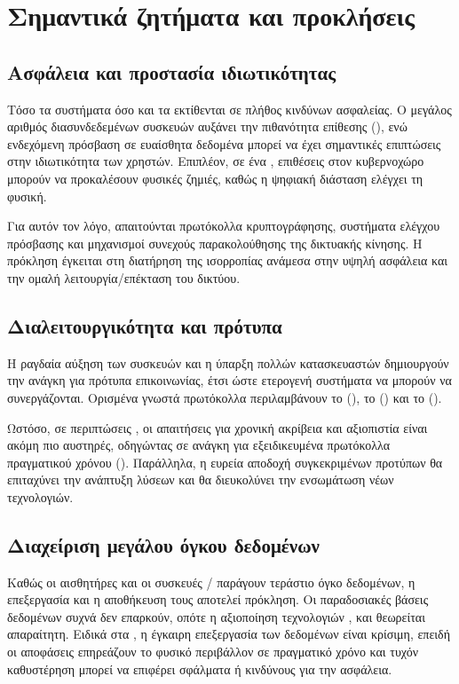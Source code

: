 \section{Σημαντικά ζητήματα και προκλήσεις}

\subsection{Ασφάλεια και προστασία ιδιωτικότητας}

Τόσο τα συστήματα  όσο και τα  εκτίθενται σε πλήθος κινδύνων ασφαλείας. Ο μεγάλος αριθμός διασυνδεδεμένων συσκευών αυξάνει την πιθανότητα επίθεσης (), ενώ ενδεχόμενη πρόσβαση σε ευαίσθητα δεδομένα μπορεί να έχει σημαντικές επιπτώσεις στην ιδιωτικότητα των χρηστών. Επιπλέον, σε ένα , επιθέσεις στον κυβερνοχώρο μπορούν να προκαλέσουν φυσικές ζημιές, καθώς η ψηφιακή διάσταση ελέγχει τη φυσική.

Για αυτόν τον λόγο, απαιτούνται πρωτόκολλα κρυπτογράφησης, συστήματα ελέγχου πρόσβασης και μηχανισμοί συνεχούς παρακολούθησης της δικτυακής κίνησης. Η πρόκληση έγκειται στη διατήρηση της ισορροπίας ανάμεσα στην υψηλή ασφάλεια και την ομαλή λειτουργία/επέκταση του δικτύου.

\subsection{Διαλειτουργικότητα και πρότυπα}

Η ραγδαία αύξηση των συσκευών και η ύπαρξη πολλών κατασκευαστών δημιουργούν την ανάγκη για πρότυπα επικοινωνίας, έτσι ώστε ετερογενή συστήματα να μπορούν να συνεργάζονται. Ορισμένα γνωστά πρωτόκολλα  περιλαμβάνουν το  (), το  () και το  ().

Ωστόσο, σε περιπτώσεις , οι απαιτήσεις για χρονική ακρίβεια και αξιοπιστία είναι ακόμη πιο αυστηρές, οδηγώντας σε ανάγκη για εξειδικευμένα πρωτόκολλα πραγματικού χρόνου (). Παράλληλα, η ευρεία αποδοχή συγκεκριμένων προτύπων θα επιταχύνει την ανάπτυξη λύσεων και θα διευκολύνει την ενσωμάτωση νέων τεχνολογιών.

\subsection{Διαχείριση μεγάλου όγκου δεδομένων}

Καθώς οι αισθητήρες και οι συσκευές / παράγουν τεράστιο όγκο δεδομένων, η επεξεργασία και η αποθήκευση τους αποτελεί πρόκληση. Οι παραδοσιακές βάσεις δεδομένων συχνά δεν επαρκούν, οπότε η αξιοποίηση τεχνολογιών ,  και  θεωρείται απαραίτητη. Ειδικά στα , η έγκαιρη επεξεργασία των δεδομένων είναι κρίσιμη, επειδή οι αποφάσεις επηρεάζουν το φυσικό περιβάλλον σε πραγματικό χρόνο και τυχόν καθυστέρηση μπορεί να επιφέρει σφάλματα ή κινδύνους για την ασφάλεια.

